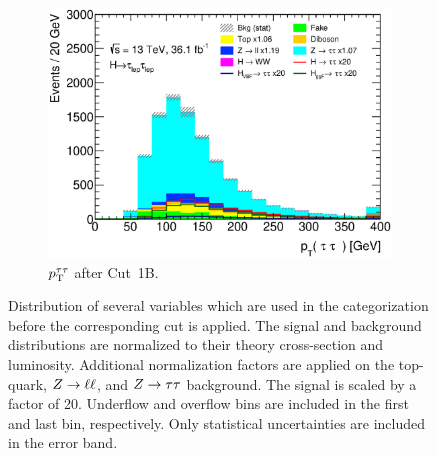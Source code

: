 \begin{figure}[htb]
\begin{subfigure}[t]{0.45\textwidth}
        \includegraphics[width=\textwidth]{./plots/event_selection/categories/ll-CutBoostedCatNoVBF-PtTauTau-lin.eps}
        \caption{$p_\text{T}^{\tau\tau}$ after Cut~1B.}\label{fig:event_selection:cutflow:boosted:pttautau}
    \end{subfigure}
    \caption{Distribution of several variables which are used in the categorization before the corresponding cut is applied.
             The signal and background distributions are normalized to their theory cross-section and luminosity.
             Additional normalization factors are applied on the top-quark, $Z \to \ell \ell$, and $Z \to \tau \tau$ background.
             The signal is scaled by a factor of 20.
             Underflow and overflow bins are included in the first and last bin, respectively.
             Only statistical uncertainties are included in the error band.}\label{fig:event_selection:categories}
\end{figure}




